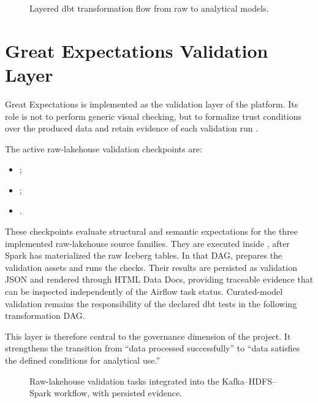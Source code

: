 \begin{figure}[H]
    \centering
    
    \caption{Layered dbt transformation flow from raw to analytical models.}
    \label{fig:chapter5-dbt-layers}
\end{figure}

\section{Great Expectations Validation Layer}
Great Expectations is implemented as the validation layer of the platform. Its role is not to perform generic visual checking, but to formalize trust conditions over the produced data and retain evidence of each validation run \cite{great_expectations_docs}.

The active raw-lakehouse validation checkpoints are:
\begin{itemize}
    \item {};
    \item {};
    \item {}.
\end{itemize}

These checkpoints evaluate structural and semantic expectations for the three implemented raw-lakehouse source families. They are executed inside , after Spark has materialized the raw Iceberg tables. In that DAG,  prepares the validation assets and  runs the checks. Their results are persisted as validation JSON and rendered through HTML Data Docs, providing traceable evidence that can be inspected independently of the Airflow task status. Curated-model validation remains the responsibility of the declared dbt tests in the following transformation DAG.

This layer is therefore central to the governance dimension of the project. It strengthens the transition from ``data processed successfully'' to ``data satisfies the defined conditions for analytical use.''

\begin{figure}[H]
    \centering
    
    \caption{Raw-lakehouse validation tasks integrated into the Kafka--HDFS--Spark workflow, with persisted evidence.}
    \label{fig:chapter5-validation-checkpoints}
\end{figure}

